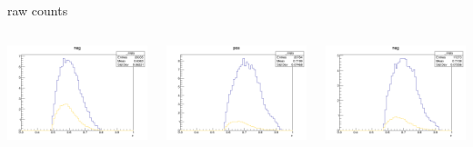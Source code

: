 \begin{frame}{raw counts}
\begin{columns}
\begin{column}[T]{0.25\textwidth}
\includegraphics[width = \textwidth]{results/yield/statistics/yield_x_Q2_z_0.55_4.764_0.60_neg.png}
\end{column}
\begin{column}[T]{0.25\textwidth}
\includegraphics[width = \textwidth]{results/yield/statistics/yield_x_Q2_z_0.55_4.764_0.70_pos.png}
\end{column}
\begin{column}[T]{0.25\textwidth}
\includegraphics[width = \textwidth]{results/yield/statistics/yield_x_Q2_z_0.55_4.764_0.70_neg.png}
\end{column}
\end{columns}
\end{frame}
